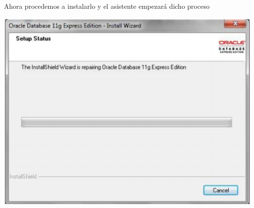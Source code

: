 \documentclass[12pt,letterpaper]{article}
\begin{document}
Ahora procedemos a instalarlo y el asistente empezará dicho proceso
\begin{center}
\includegraphics[width=15cm]{./IMG/img3}
\end{center} 
\end{document}
